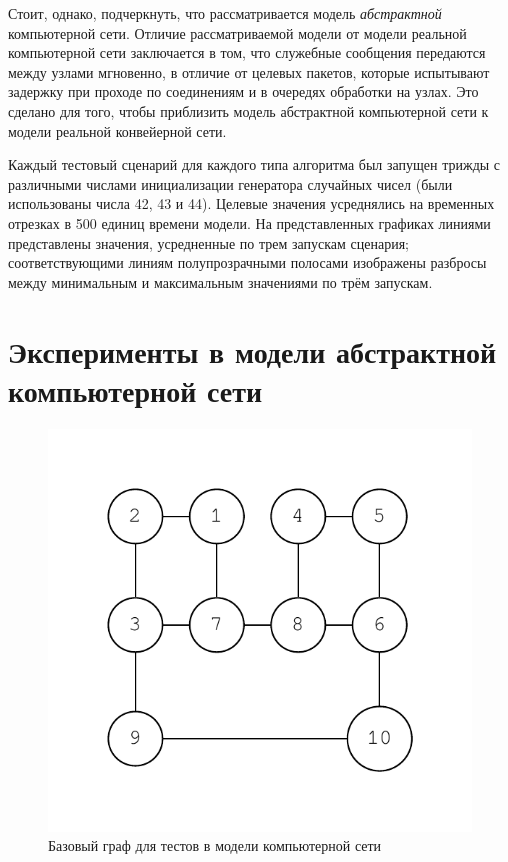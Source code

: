 \documentclass[specification,annotation,times]{itmo-student-thesis}
\theoremstyle{definition}
\begin{document}
Стоит, однако, подчеркнуть, что рассматривается модель \textit{абстрактной}
компьютерной сети. Отличие рассматриваемой модели от модели реальной
компьютерной сети заключается в том, что служебные сообщения передаются между
узлами мгновенно, в отличие от целевых пакетов, которые испытывают задержку при
проходе по соединениям и в очередях обработки на узлах. Это сделано для того,
чтобы приблизить модель абстрактной компьютерной сети к модели реальной
конвейерной сети.

Каждый тестовый сценарий для каждого типа алгоритма был запущен трижды с
различными числами инициализации генератора случайных чисел (были использованы
числа 42, 43 и 44). Целевые значения усреднялись на временных отрезках в 500
единиц времени модели. На представленных графиках линиями представлены значения,
усредненные по трем запускам сценария; соответствующими линиям полупрозрачными
полосами изображены разбросы между минимальным и максимальным значениями по трём
запускам.

\section{Эксперименты в модели абстрактной компьютерной сети}\label{experiments:network}

\begin{figure}[!h]
  \caption{Базовый граф для тестов в модели компьютерной сети}\label{fig-simple-network}
  \centering
  \includegraphics[scale=0.6]{graph-2.pdf}
\end{figure}
\end{document}
